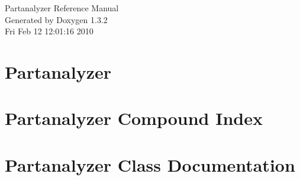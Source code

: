 \documentclass[a4paper]{book}
\begin{document}
\begin{titlepage}
\vspace*{7cm}
\begin{center}
{\Large Partanalyzer Reference Manual}\\
\vspace*{1cm}
{\large Generated by Doxygen 1.3.2}\\
\vspace*{0.5cm}
{\small Fri Feb 12 12:01:16 2010}\\
\end{center}
\end{titlepage}
\clearemptydoublepage
{}
\tableofcontents
\clearemptydoublepage
{}
\chapter{Partanalyzer }
\label{index}
\chapter{Partanalyzer Compound Index}

\chapter{Partanalyzer Class Documentation}












\printindex
\end{document}
